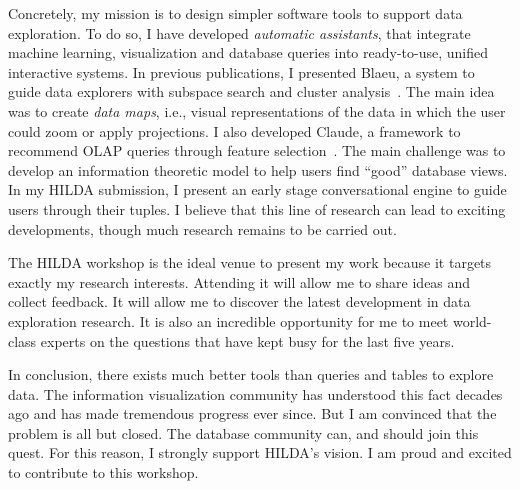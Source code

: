 \documentclass{article}
\begin{document}
Concretely, my mission is to design simpler software tools to support data
exploration. To do so, I have developed \emph{automatic assistants}, that
integrate machine learning, visualization and database queries into
ready-to-use, unified interactive systems.  In previous publications, I
presented Blaeu, a system to guide data explorers with subspace search and
cluster analysis~\cite{sellamTKDE, sellam2013meet}.  The main idea was to
create \emph{data maps}, i.e., visual representations of the data in which the
user could zoom or apply projections.  I also developed Claude, a framework to
recommend OLAP queries through feature selection~\cite{Sellam2015Semi}.  The
main challenge was to develop an information theoretic model to help users find
``good'' database views.  In my HILDA submission, I present an early stage
conversational engine to guide users through their tuples. I believe that this
line of research can lead to exciting developments, though much research
remains to be carried out.

The HILDA workshop is the ideal venue to present my work because it targets
exactly my research interests. Attending it will allow me to share ideas and
collect feedback. It will allow me to discover the latest development in data
exploration research. It is also an incredible opportunity for me to meet
world-class experts on the questions that have kept busy for the last five
years.

In conclusion, there exists much better tools than queries and tables to explore
data. The information visualization community has understood this fact decades
ago and has made tremendous progress ever since. But I am convinced that the 
problem is all but closed. The database community can, and should join this
quest. For this reason, I strongly support HILDA's vision. I am 
proud and excited to contribute to this workshop.

\small


\end{document}
